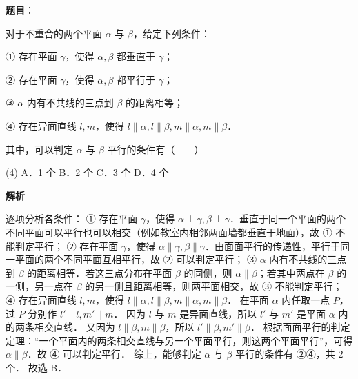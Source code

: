 \begin{answer}

\textbf{题目}：

对于不重合的两个平面 $\alpha$ 与 $\beta$，给定下列条件：

① 存在平面 $\gamma$，使得 $\alpha, \beta$ 都垂直于 $\gamma$；

② 存在平面 $\gamma$，使得 $\alpha, \beta$ 都平行于 $\gamma$；

③ $\alpha$ 内有不共线的三点到 $\beta$ 的距离相等；

④ 存在异面直线 $l, m$，使得 $l \parallel \alpha, l \parallel \beta, m \parallel \alpha, m \parallel \beta$．

其中，可以判定 $\alpha$ 与 $\beta$ 平行的条件有\mbox{（　　）}

\begin{gkopts}(4)
\task A．1 个
\task B．2 个
\task C．3 个
\task D．4 个
\end{gkopts}

\textbf{解析}

逐项分析各条件：
① 存在平面 $\gamma$，使得 $\alpha \perp \gamma, \beta \perp \gamma$．垂直于同一个平面的两个不同平面可以平行也可以相交（例如教室内相邻两面墙都垂直于地面），故 ① 不能判定平行；
② 存在平面 $\gamma$，使得 $\alpha \parallel \gamma, \beta \parallel \gamma$．由面面平行的传递性，平行于同一平面的两个不同平面互相平行，故 ② 可以判定平行；
③ $\alpha$ 内有不共线的三点到 $\beta$ 的距离相等．若这三点分布在平面 $\beta$ 的同侧，则 $\alpha \parallel \beta$；若其中两点在 $\beta$ 的一侧，另一点在 $\beta$ 的另一侧且距离相等，则两平面相交，故 ③ 不能判定平行；
④ 存在异面直线 $l, m$，使得 $l \parallel \alpha, l \parallel \beta, m \parallel \alpha, m \parallel \beta$．
在平面 $\alpha$ 内任取一点 $P$，过 $P$ 分别作 $l' \parallel l, m' \parallel m$．
因为 $l$ 与 $m$ 是异面直线，所以 $l'$ 与 $m'$ 是平面 $\alpha$ 内的两条相交直线．
又因为 $l \parallel \beta, m \parallel \beta$，所以 $l' \parallel \beta, m' \parallel \beta$．
根据面面平行的判定定理：“一个平面内的两条相交直线与另一个平面平行，则这两个平面平行”，可得 $\alpha \parallel \beta$．故 ④ 可以判定平行．
综上，能够判定 $\alpha$ 与 $\beta$ 平行的条件有 ②④，共 2 个．
故选 B．


\end{answer}
